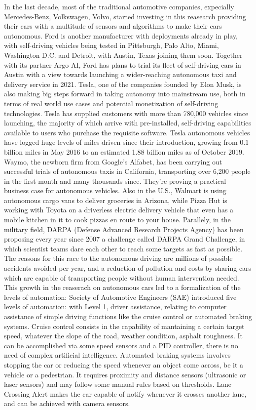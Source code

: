 In the last decade, most of the traditional automotive companies, expecially Mercedes-Benz, Volkswagen, Volvo, started investing in this reasearch providing their cars with a multitude of sensors and algorithms to make their cars autonomous. Ford is another manufacturer with deployments already in play, with self-driving vehicles being tested in Pittsburgh, Palo Alto, Miami, Washington D.C. and Detroit, with Austin, Texas joining them soon. Together with its partner Argo AI, Ford has plans to trial its fleet of self-driving cars in Austin with a view towards launching a wider-reaching autonomous taxi and delivery service in 2021.
Tesla, one of the companies founded by Elon Musk, is also making big steps forward in taking autonomy into mainstream use, both in terms of real world use cases and potential monetization of self-driving technologies. Tesla has supplied customers with more than 780,000 vehicles since launching, the majority of which arrive with pre-installed, self-driving capabilities available to users who purchase the requisite software. Tesla autonomous vehicles have logged huge levels of miles driven since their introduction, growing from 0.1 billion miles in May 2016 to an estimated 1.88 billion miles as of October 2019.
Waymo, the newborn firm from Google's Alfabet, has been carrying out successful trials of autonomous taxis in California, transporting over 6,200 people in the first month and many thousands since. They're proving a practical business case for autonomous vehicles.
Also in the U.S., Walmart is using autonomous cargo vans to deliver groceries in Arizona, while Pizza Hut is working with Toyota on a driverless electric delivery vehicle that even has a mobile kitchen in it to cook pizzas en route to your house.
Parallely, in the military field, DARPA (Defense Advanced Research Projects Agency) has been proposing every year since 2007 a challenge called DARPA Grand Challenge, in which scientist teams dare each other to reach some targets as fast as possible.
The reasons for this race to the autonomous driving are millions of possible accidents avoided per year, and a reduction of pollution and costs by sharing cars which are capable of transporting people without human intervention needed.
This growth in the reaserach on autonomous cars led to a formalization of the levels of automation: Society of Automotive Engineers (SAE) introduced five levels of automation: with Level 1, driver assistance, relating to computer assistance of simple driving functions like the cruise control or automated braking systems. Cruise control consists in the capability of mantaining a certain target speed, whatever the slope of the road, weather condition, asphalt roughness. It can be accomplished via some speed sensors and a PID controller, there is no need of complex artificial intelligence. Automated braking systems involves stopping the car or reducing the speed whenever an object come across, be it a vehicle or a pedestrian. It requires proximity and distance sensors (ultrasonic or laser sensors) and may follow some manual rules based on thresholds. Lane Crossing Alert makes the car capable of notify whenever it crosses another lane, and can be achieved with camera sensors.

